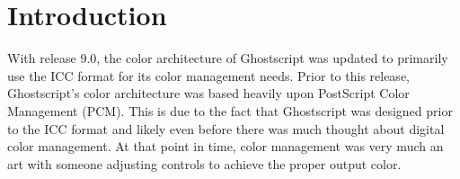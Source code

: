 \documentclass[12pt,notitlepage]{article}
\begin{document}
\clearpage

\singlespace

\section{Introduction}

With release 9.0, the color architecture of Ghostscript was updated to primarily use the ICC\cite{ICC} format for its color management needs.  Prior to this release, Ghostscript's color architecture was based heavily upon PostScript\cite{PS} Color Management (PCM).  This is due to the fact that Ghostscript was designed prior to the ICC format and likely even before there was much thought about digital color management.  At that point in time, color management was very much an art with someone adjusting controls to achieve the proper output color.
\end{document}

